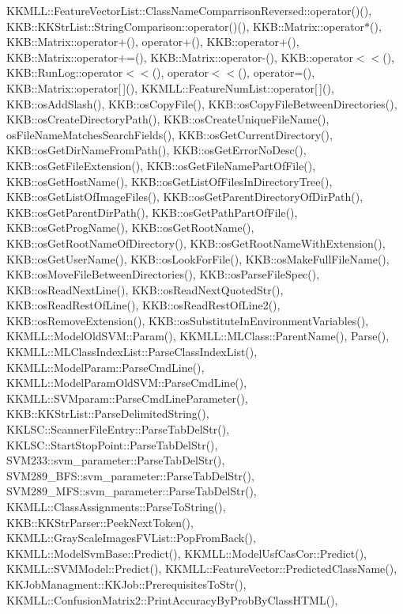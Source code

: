 K\+K\+M\+L\+L\+::\+Feature\+Vector\+List\+::\+Class\+Name\+Comparrison\+Reversed\+::operator()(), K\+K\+B\+::\+K\+K\+Str\+List\+::\+String\+Comparison\+::operator()(), K\+K\+B\+::\+Matrix\+::operator$\ast$(), K\+K\+B\+::\+Matrix\+::operator+(), operator+(), K\+K\+B\+::operator+(), K\+K\+B\+::\+Matrix\+::operator+=(), K\+K\+B\+::\+Matrix\+::operator-\/(), K\+K\+B\+::operator$<$$<$(), K\+K\+B\+::\+Run\+Log\+::operator$<$$<$(), operator$<$$<$(), operator=(), K\+K\+B\+::\+Matrix\+::operator\mbox{[}$\,$\mbox{]}(), K\+K\+M\+L\+L\+::\+Feature\+Num\+List\+::operator\mbox{[}$\,$\mbox{]}(), K\+K\+B\+::os\+Add\+Slash(), K\+K\+B\+::os\+Copy\+File(), K\+K\+B\+::os\+Copy\+File\+Between\+Directories(), K\+K\+B\+::os\+Create\+Directory\+Path(), K\+K\+B\+::os\+Create\+Unique\+File\+Name(), os\+File\+Name\+Matches\+Search\+Fields(), K\+K\+B\+::os\+Get\+Current\+Directory(), K\+K\+B\+::os\+Get\+Dir\+Name\+From\+Path(), K\+K\+B\+::os\+Get\+Error\+No\+Desc(), K\+K\+B\+::os\+Get\+File\+Extension(), K\+K\+B\+::os\+Get\+File\+Name\+Part\+Of\+File(), K\+K\+B\+::os\+Get\+Host\+Name(), K\+K\+B\+::os\+Get\+List\+Of\+Files\+In\+Directory\+Tree(), K\+K\+B\+::os\+Get\+List\+Of\+Image\+Files(), K\+K\+B\+::os\+Get\+Parent\+Directory\+Of\+Dir\+Path(), K\+K\+B\+::os\+Get\+Parent\+Dir\+Path(), K\+K\+B\+::os\+Get\+Path\+Part\+Of\+File(), K\+K\+B\+::os\+Get\+Prog\+Name(), K\+K\+B\+::os\+Get\+Root\+Name(), K\+K\+B\+::os\+Get\+Root\+Name\+Of\+Directory(), K\+K\+B\+::os\+Get\+Root\+Name\+With\+Extension(), K\+K\+B\+::os\+Get\+User\+Name(), K\+K\+B\+::os\+Look\+For\+File(), K\+K\+B\+::os\+Make\+Full\+File\+Name(), K\+K\+B\+::os\+Move\+File\+Between\+Directories(), K\+K\+B\+::os\+Parse\+File\+Spec(), K\+K\+B\+::os\+Read\+Next\+Line(), K\+K\+B\+::os\+Read\+Next\+Quoted\+Str(), K\+K\+B\+::os\+Read\+Rest\+Of\+Line(), K\+K\+B\+::os\+Read\+Rest\+Of\+Line2(), K\+K\+B\+::os\+Remove\+Extension(), K\+K\+B\+::os\+Substitute\+In\+Environment\+Variables(), K\+K\+M\+L\+L\+::\+Model\+Old\+S\+V\+M\+::\+Param(), K\+K\+M\+L\+L\+::\+M\+L\+Class\+::\+Parent\+Name(), Parse(), K\+K\+M\+L\+L\+::\+M\+L\+Class\+Index\+List\+::\+Parse\+Class\+Index\+List(), K\+K\+M\+L\+L\+::\+Model\+Param\+::\+Parse\+Cmd\+Line(), K\+K\+M\+L\+L\+::\+Model\+Param\+Old\+S\+V\+M\+::\+Parse\+Cmd\+Line(), K\+K\+M\+L\+L\+::\+S\+V\+Mparam\+::\+Parse\+Cmd\+Line\+Parameter(), K\+K\+B\+::\+K\+K\+Str\+List\+::\+Parse\+Delimited\+String(), K\+K\+L\+S\+C\+::\+Scanner\+File\+Entry\+::\+Parse\+Tab\+Del\+Str(), K\+K\+L\+S\+C\+::\+Start\+Stop\+Point\+::\+Parse\+Tab\+Del\+Str(), S\+V\+M233\+::svm\+\_\+parameter\+::\+Parse\+Tab\+Del\+Str(), S\+V\+M289\+\_\+\+B\+F\+S\+::svm\+\_\+parameter\+::\+Parse\+Tab\+Del\+Str(), S\+V\+M289\+\_\+\+M\+F\+S\+::svm\+\_\+parameter\+::\+Parse\+Tab\+Del\+Str(), K\+K\+M\+L\+L\+::\+Class\+Assignments\+::\+Parse\+To\+String(), K\+K\+B\+::\+K\+K\+Str\+Parser\+::\+Peek\+Next\+Token(), K\+K\+M\+L\+L\+::\+Gray\+Scale\+Images\+F\+V\+List\+::\+Pop\+From\+Back(), K\+K\+M\+L\+L\+::\+Model\+Svm\+Base\+::\+Predict(), K\+K\+M\+L\+L\+::\+Model\+Usf\+Cas\+Cor\+::\+Predict(), K\+K\+M\+L\+L\+::\+S\+V\+M\+Model\+::\+Predict(), K\+K\+M\+L\+L\+::\+Feature\+Vector\+::\+Predicted\+Class\+Name(), K\+K\+Job\+Managment\+::\+K\+K\+Job\+::\+Prerequisites\+To\+Str(), K\+K\+M\+L\+L\+::\+Confusion\+Matrix2\+::\+Print\+Accuracy\+By\+Prob\+By\+Class\+H\+T\+M\+L(), 